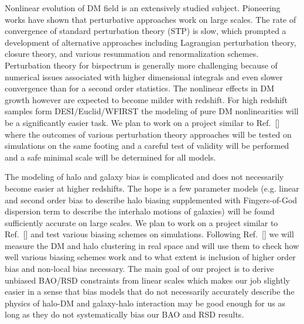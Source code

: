 Nonlinear evolution of DM field is an extensively studied subject. Pioneering
works have shown that perturbative approaches work on large scales. The rate of
convergence of standard perturbation theory (STP) is slow, which prompted a
development of alternative approaches including Lagrangian perturbation theory,
closure theory, and various resummation and renormalization schemes.
Perturbation theory for bispectrum is generally more challenging because of
numerical issues associated with higher dimensional integrals and even slower
convergence than for a second order statistics. The nonlinear effects in DM
growth however are expected to become milder with redshift. For high redshift
samples form DESI/Euclid/WFIRST the modeling of pure DM nonlinearities will be
a significantly easier task. We plan to work on a project similar to Ref.~[]
where the outcomes of various perturbation theory approaches will be tested on
simulations on the same footing and a careful test of validity will be
performed and a safe minimal scale will be determined for all models.

The modeling of halo and galaxy bias is complicated and does not necessarily
become easier at higher redshifts. The hope is a few parameter models (e.g.
linear and second order bias to describe halo biasing supplemented with
Fingers-of-God dispersion term to describe the interhalo motions of galaxies)
will be found sufficiently accurate on large scales. We plan to work on a
project similar to Ref.~[] and test various biasing schemes on simulations.
Following Ref.~[] we will measure the DM and halo clustering in real space and
will use them to check how well various biasing schemes work and to what extent
is inclusion of higher order bias and non-local bias necessary. The main goal
of our project is to derive unbiased BAO/RSD constraints from linear scales
which makes our job slightly easier in a sense that bias models that do not
necessarily accurately describe the physics of halo-DM and galaxy-halo
interaction may be good enough for us as long as they do not systematically
bias our BAO and RSD results.

